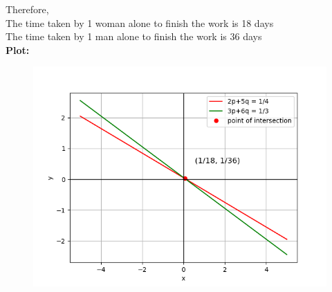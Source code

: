 \documentclass[journal]{IEEEtran}
\begin{document}
Therefore,\\
The time taken by 1 woman alone to finish the work is 18 days\\
The time taken by 1 man alone to finish the work is 36 days\\

\textbf{Plot:}\\
\begin{figure}[h]
   \centering
   \includegraphics[width=\columnwidth]{figs/figure.png}
\end{figure}
\end{document}

